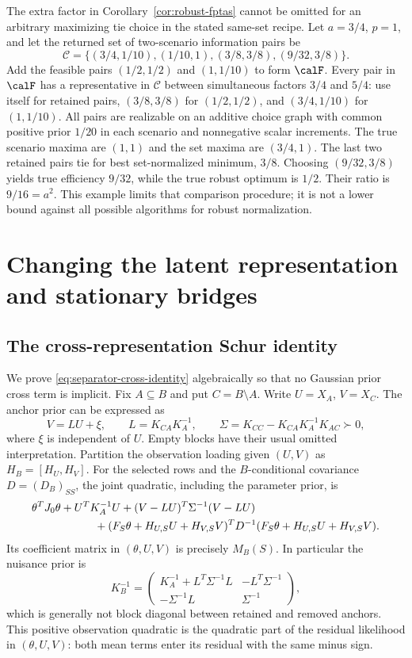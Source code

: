 The extra factor in Corollary~\ref{cor:robust-fptas} cannot be omitted for
an arbitrary maximizing tie choice in the stated same-set recipe. Let
$a=3/4$, $p=1$, and let the returned set of two-scenario information pairs be
\[
 \mathcal C=\{(3/4,1/10),(1/10,1),(3/8,3/8),(9/32,3/8)\}.
\]
Add the feasible pairs $(1/2,1/2)$ and $(1,1/10)$ to form $\calF$.
Every pair in $\calF$ has a representative in $\mathcal C$ between
simultaneous factors $3/4$ and $5/4$: use itself for retained pairs,
$(3/8,3/8)$ for $(1/2,1/2)$, and $(3/4,1/10)$ for $(1,1/10)$.
All pairs are realizable on an additive choice graph with common positive
prior $1/20$ in each scenario and nonnegative scalar increments.
The true scenario maxima are $(1,1)$ and the set maxima are $(3/4,1)$.
The last two retained pairs tie for best set-normalized minimum, $3/8$.
Choosing $(9/32,3/8)$ yields true efficiency $9/32$, while the true robust
optimum is $1/2$. Their ratio is $9/16=a^2$.
This example limits that comparison procedure; it is not a lower bound
against all possible algorithms for robust normalization.

\section{Changing the latent representation and stationary bridges}
\label{app:separator-hierarchy}

\subsection{The cross-representation Schur identity}
We prove \eqref{eq:separator-cross-identity} algebraically so that no Gaussian
prior cross term is implicit. Fix $A\subseteq B$ and put $C=B\setminus A$.
Write $U=X_A$, $V=X_C$. The anchor prior can be expressed as
\[
 V=L U+\xi,\qquad L=K_{CA}K_A^{-1},\qquad
 \Sigma=K_{CC}-K_{CA}K_A^{-1}K_{AC}\succ0,
\]
where $\xi$ is independent of $U$. Empty blocks have their usual omitted
interpretation. Partition the observation loading given $(U,V)$ as
$H_B=[H_U,H_V]$. For the selected rows and the $B$-conditional covariance
$D=(D_B)_{SS}$, the joint quadratic, including the parameter prior, is
\begin{align}\label{eq:anchor-joint-quadratic}
 &\theta^TJ_0\theta+U^TK_A^{-1}U
 +(V-LU)^T\Sigma^{-1}(V-LU)\nonumber\\
 &\hspace{20mm}+(F_S\theta+H_{U,S}U+H_{V,S}V)^T
 D^{-1}(F_S\theta+H_{U,S}U+H_{V,S}V).
\end{align}
Its coefficient matrix in $(\theta,U,V)$ is precisely $M_B(S)$.
In particular the nuisance prior is
\[
 K_B^{-1}=\begin{pmatrix}
 K_A^{-1}+L^T\Sigma^{-1}L&-L^T\Sigma^{-1}\\
 -\Sigma^{-1}L&\Sigma^{-1}
 \end{pmatrix},
\]
which is generally not block diagonal between retained and removed anchors.
This positive observation quadratic is the quadratic part of the residual
likelihood in $(\theta,U,V)$: both mean terms enter its residual with the
same minus sign.

